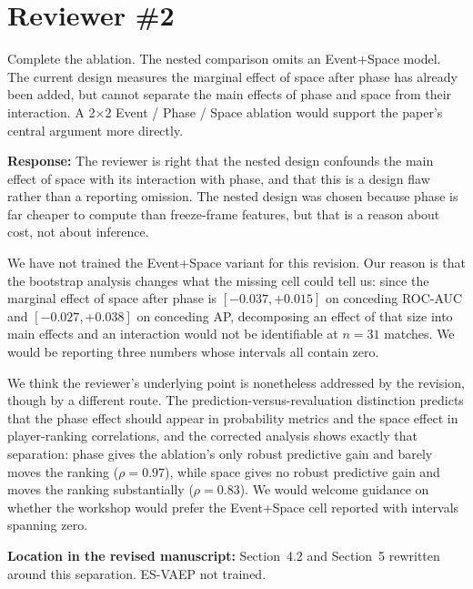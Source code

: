 \documentclass[11pt,a4paper]{article}
\newcommand{\response}[2]{%
  \begin{responsebox}
  \textbf{Response:}
  #1
  \end{responsebox}
  \begin{locationbox}
  \textbf{Location in the revised manuscript:}
  #2
  \end{locationbox}
}
\begin{document}
\clearpage
\section{Reviewer \#2}

\begin{reviewbox}
Complete the ablation. The nested comparison omits an Event+Space model. The current design measures the marginal effect of space after phase has already been added, but cannot separate the main effects of phase and space from their interaction. A 2×2 Event / Phase / Space ablation would support the paper's central argument more directly.
\end{reviewbox}
\response{The reviewer is right that the nested design confounds the main effect of space with its interaction with phase, and that this is a design flaw rather than a reporting omission. The nested design was chosen because phase is far cheaper to compute than freeze-frame features, but that is a reason about cost, not about inference.

We have not trained the Event+Space variant for this revision. Our reason is that the bootstrap analysis changes what the missing cell could tell us: since the marginal effect of space after phase is $[-0.037, +0.015]$ on conceding ROC-AUC and $[-0.027, +0.038]$ on conceding AP, decomposing an effect of that size into main effects and an interaction would not be identifiable at $n = 31$ matches. We would be reporting three numbers whose intervals all contain zero.

We think the reviewer's underlying point is nonetheless addressed by the revision, though by a different route. The prediction-versus-revaluation distinction predicts that the phase effect should appear in probability metrics and the space effect in player-ranking correlations, and the corrected analysis shows exactly that separation: phase gives the ablation's only robust predictive gain and barely moves the ranking ($\rho = 0.97$), while space gives no robust predictive gain and moves the ranking substantially ($\rho = 0.83$). We would welcome guidance on whether the workshop would prefer the Event+Space cell reported with intervals spanning zero.}{Section~4.2 and Section~5 rewritten around this separation. ES-VAEP not trained.}
\end{document}
